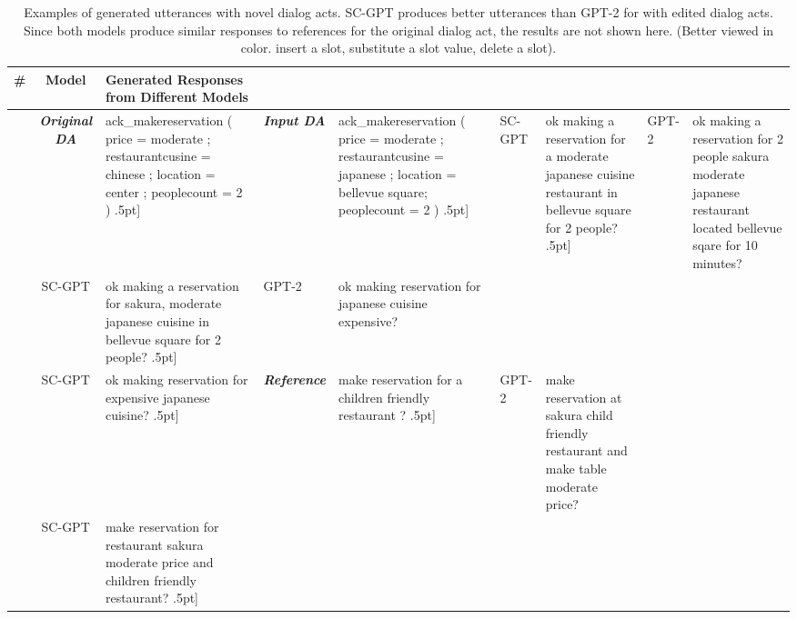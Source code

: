 \documentclass[11pt,a4paper]{article}
\begin{document}
\begin{table*}[t!]\centering
\begin{minipage}{15.6cm}\vspace{0mm}    \centering
\begin{tcolorbox} 
    \centering
    \scriptsize
     \hspace{-6mm}
    \begin{tabular}{ccp{}}
\# & \textbf{Model} & \textbf{Generated Responses from Different Models} \\
    \midrule
    \ & \textit{\textbf{Original DA}} & ack\_makereservation ( price = moderate ; restaurantcusine = chinese ; location = center ; peoplecount = 2 ) \2.5pt]
     & \textit{\textbf{Input DA}} & ack\_makereservation ( price = moderate ; restaurantcusine = \colorbox{blue!30}{japanese} ; location = \colorbox{blue!30}{bellevue square}; peoplecount = 2 ) \2.5pt]
    \ & SC-GPT & ok making a reservation for a moderate japanese cuisine restaurant in bellevue square for 2 people? \2.5pt]
    \ & GPT-2 & ok making a reservation for 2 people sakura moderate japanese restaurant located bellevue sqare for 10 minutes? \\ [2.5pt]
    \ & SC-GPT & ok making a reservation for sakura, moderate japanese cuisine in bellevue square for 2 people? \2.5pt]
    \ & GPT-2 & ok making reservation for japanese cuisine expensive? \\ [2.5pt]
    \ & SC-GPT &  ok making reservation for expensive japanese cuisine? \2.5pt]
    \ & \textit{\textbf{Reference}} & make reservation for a children friendly restaurant ? \2.5pt]
    \ & GPT-2 & make reservation at sakura child friendly restaurant and make table moderate price? \\ [2.5pt]
    \ & SC-GPT &  make reservation for restaurant sakura moderate price and children friendly restaurant? \2.5pt] \vspace{-3mm}
    \end{tabular}
\end{tcolorbox}
\vspace{-2mm}
\caption{Examples of generated utterances with novel dialog acts. SC-GPT produces better utterances than GPT-2 for with edited dialog acts. Since both models produce similar responses to references for the original dialog act, the results are not shown here.  (Better viewed in color. \colorbox{mygreen!30}{insert a slot}, \colorbox{blue!30}{substitute a slot value}, \colorbox{red!30}{ delete a slot}).}
    \label{tab:new_domain_examples}
\end{minipage}
\vspace{-2mm}
\end{table*}
\end{document}
